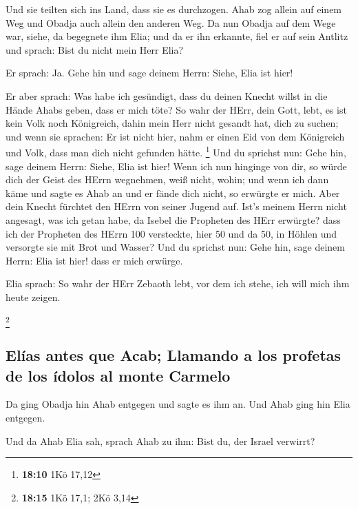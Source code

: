  Und sie teilten sich ins Land, dass sie es durchzogen.
Ahab zog allein auf einem Weg und Obadja auch allein den anderen Weg.
 Da nun Obadja auf dem Wege war, siehe, da begegnete ihm
Elia; und da er ihn erkannte, fiel er auf sein Antlitz und sprach: Bist
du nicht mein Herr Elia?

 Er sprach: Ja. Gehe hin und sage deinem Herrn: Siehe,
Elia ist hier!

 Er aber sprach: Was habe ich gesündigt, dass du deinen
Knecht willst in die Hände Ahabs geben, dass er mich töte?
 So wahr der HErr, dein Gott, lebt, es ist kein Volk noch
Königreich, dahin mein Herr nicht gesandt hat, dich zu suchen; und wenn
sie sprachen: Er ist nicht hier, nahm er einen Eid von dem Königreich
und Volk, dass man dich nicht gefunden hätte. \footnote{\textbf{18:10}
  1Kö 17,12}  Und du sprichst nun: Gehe hin, sage deinem
Herrn: Siehe, Elia ist hier!  Wenn ich nun hinginge von
dir, so würde dich der Geist des HErrn wegnehmen, weiß nicht, wohin; und
wenn ich dann käme und sagte es Ahab an und er fände dich nicht, so
erwürgte er mich. Aber dein Knecht fürchtet den HErrn von seiner Jugend
auf.  Ist's meinem Herrn nicht angesagt, was ich getan
habe, da Isebel die Propheten des HErr erwürgte? dass ich der Propheten
des HErrn 100 versteckte, hier 50 und da 50, in Höhlen und versorgte sie
mit Brot und Wasser?  Und du sprichst nun: Gehe hin, sage
deinem Herrn: Elia ist hier! dass er mich erwürge.

 Elia sprach: So wahr der HErr Zebaoth lebt, vor dem ich
stehe, ich will mich ihm heute zeigen.

\footnote{\textbf{18:15} 1Kö 17,1; 2Kö 3,14}

\hypertarget{eluxedas-antes-que-acab-llamando-a-los-profetas-de-los-uxeddolos-al-monte-carmelo}{%
\subsection{Elías antes que Acab; Llamando a los profetas de los ídolos
al monte
Carmelo}\label{eluxedas-antes-que-acab-llamando-a-los-profetas-de-los-uxeddolos-al-monte-carmelo}}

 Da ging Obadja hin Ahab entgegen und sagte es ihm an.
Und Ahab ging hin Elia entgegen.

 Und da Ahab Elia sah, sprach Ahab zu ihm: Bist du, der
Israel verwirrt?

